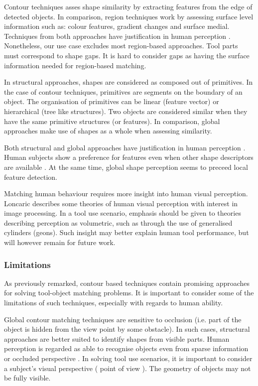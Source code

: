 \documentclass[
    a4paper,
    man,
    floatsintext,
    british
]{apa6}
\begin{document}
Contour techniques asses shape similarity by extracting features from the edge of detected objects. In comparison, region techniques work by assessing surface level information such as: colour features, gradient changes and surface medial. Techniques from both approaches have justification in human perception \cite{chatbri2016}. Nonetheless, our use case excludes most region-based approaches. Tool parts must correspond to shape gaps. It is hard to consider gaps as having the surface information needed for region-based matching.

In structural approaches, shapes are considered as composed out of primitives. In the case of contour techniques, primitives are segments on the boundary of an object. The organisation of primitives can be linear (feature vector\cite{zhang2004}) or hierarchical (tree like structures\cite{zhu2015}). Two objects are considered similar when they have the same primitive structures (or features). In comparison, global approaches make use of shapes as a whole when assessing similarity. 

Both structural and global approaches have justification in human perception \cite{zhang2004}. Human subjects show a preference for features even when other shape descriptors are available \cite{chatbri2016}. At the same time, global shape perception seems to preceed local feature detection\cite{navon1977}. 

Matching human behaviour requires more insight into human visual perception. Loncaric\cite{loncaric1998} describes some theories of human visual perception with interest in image processing. In a tool use scenario, emphasis should be given to theories describing perception as volumetric, such as through the use of generalised cylinders (geons\cite{dickinson2014}). Such insight may better explain human tool performance, but will however remain for future work.    

\subsubsection{Limitations}
As previously remarked, contour based techniques contain promising approaches for solving tool-object matching problems. It is important to consider some of the limitations of such techniques, especially with regards to human ability. 

Global contour matching techniques are sensitive to occlusion (i.e. part of the object is hidden from the view point by some obstacle). In such cases, structural approaches are better suited to identify shapes from visible parts. Human perception is regarded as able to recognise objects even from sparse information or occluded perspective \cite{loncaric1998}. In solving tool use scenarios, it is important to consider a subject's visual perspective ( point of view ). The geometry of objects may not be fully visible. 
\end{document}
